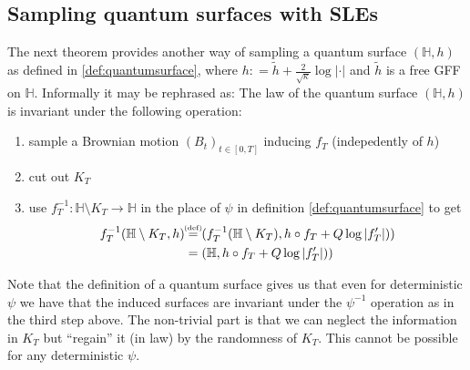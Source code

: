 \documentclass[11pt,reqno]{amsart}
\numberwithin{equation}{section}
\newtheorem{thm}{Theorem}[section]
\newtheorem{rem}[thm]{Remark}
\newcommand{\eqbydef}{\mathrel{\stackrel{\hspace*{-3mm}\text{\tiny(def)}\hspace*{-3mm}}{=}}}
\newcommand{\deq}{\mathrel{\mathop:}=}
\newcommand{\eps}{\varepsilon}
\begin{document}
\subsection{Sampling quantum surfaces with SLEs}
The next theorem provides another way of sampling a quantum surface $(\mathbb H,h)$ as defined in \ref{def:quantumsurface}, where $h\deq \tilde h+\frac{2}{\sqrt\kappa}\log|\cdot|$ and $\tilde h$ is a free GFF on $\mathbb H$. Informally it may be rephrased as:
The law of the quantum surface $(\mathbb H,h)$ is invariant under the following operation:
\begin{enumerate}
	\item sample a Brownian motion $(B_t)_{t\in[0,T]}$ inducing $f_T$ (indepedently of $h$)
	\item cut out $K_T$
	\item use $f_T^{-1}:\mathbb H\setminus K_T\rightarrow\mathbb H$ in the place of $\psi$ in definition \ref{def:quantumsurface} to get \begin{align*}
			f_T^{-1}(\mathbb H\setminus K_T, h)&\eqbydef (f_T^{-1}(\mathbb H\setminus K_T),h\circ f_T+Q\log|f'_T|))\\ &= (\mathbb H,h\circ f_T+Q\log|f'_T|))
		\end{align*}
\end{enumerate}
Note that the definition of a quantum surface gives us that even for deterministic $\psi$ we have that the induced surfaces are invariant under the $\psi^{-1}$ operation as in the third step above. The non-trivial part is that we can neglect the information in $K_T$ but ``regain'' it (in law) by the randomness of $K_T$. This cannot be possible for any deterministic $\psi$.



	
	

\end{document}
